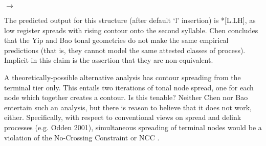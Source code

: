 \documentclass{article}
\begin{document}
\begin{center}
\hspace{.3cm}
$\rightarrow$
\hspace{.3cm}
\end{center}
The predicted output for this structure (after default `l' insertion) is *[L.LH], as low register spreads with rising contour onto the second syllable. Chen concludes that the Yip and Bao tonal geometries do not make the same empirical predictions (that is, they cannot model the same attested classes of process). Implicit in this claim is the assertion that they are non-equivalent.\par
A theoretically-possible alternative analysis has contour spreading from the terminal tier only. This entails two iterations of tonal node spread, one for each node which together creates a contour. Is this tenable? Neither Chen nor Bao entertain such an analysis, but there is reason to believe that it does not work, either. Specifically, with respect to conventional views on spread and delink processes (e.g. Odden 2001), simultaneous spreading of terminal nodes would be a violation of the No-Crossing Constraint or NCC \citep{Odden2001, Goldsmith1976}.
\end{document}
